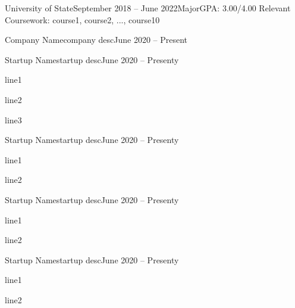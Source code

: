 \documentclass[hidelinks]{simp_styling} %
\begin{document}
\printname
\printbyline



\begin{rEducation}{University of State}{September 2018 – June 2022}{Major}{GPA: 3.00/4.00}
Relevant Coursework: course1, course2, ..., course10
\end{rEducation}


\begin{rSubsection}{Company Name}{company desc}{June 2020 – Present}{}
\end{rSubsection}

\begin{rSubsection}{Startup Name}{startup desc}{June 2020 – Present}{y}
\item line1
\item line2
\item line3
\end{rSubsection}



\begin{rSubsection}{Startup Name}{startup desc}{June 2020 – Present}{y}
\item line1
\item line2
\end{rSubsection}

\begin{rSubsection}{Startup Name}{startup desc}{June 2020 – Present}{y}
\item line1
\item line2
\end{rSubsection}

\begin{rSubsection}{Startup Name}{startup desc}{June 2020 – Present}{y}
\item line1
\item line2
\end{rSubsection}
\end{document}
